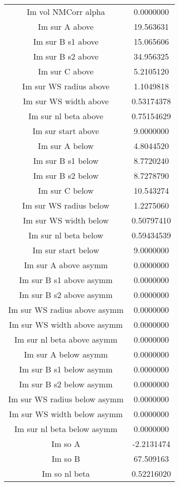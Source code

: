 \begin{tabular}{|c||c|}
Im vol NMCorr alpha & 0.0000000\\
Im sur A above & 19.563631\\
Im sur B s1 above & 15.065606\\
Im sur B s2 above & 34.956325\\
Im sur C above & 5.2105120\\
Im sur WS radius above & 1.1049818\\
Im sur WS width above & 0.53174378\\
Im sur nl beta above & 0.75154629\\
Im sur start above & 9.0000000\\
Im sur A below & 4.8044520\\
Im sur B s1 below & 8.7720240\\
Im sur B s2 below & 8.7278790\\
Im sur C below & 10.543274\\
Im sur WS radius below & 1.2275060\\
Im sur WS width below & 0.50797410\\
Im sur nl beta below & 0.59434539\\
Im sur start below & 9.0000000\\
Im sur A above asymm & 0.0000000\\
Im sur B s1 above asymm & 0.0000000\\
Im sur B s2 above asymm & 0.0000000\\
Im sur WS radius above asymm & 0.0000000\\
Im sur WS width above asymm & 0.0000000\\
Im sur nl beta above asymm & 0.0000000\\
Im sur A below asymm & 0.0000000\\
Im sur B s1 below asymm & 0.0000000\\
Im sur B s2 below asymm & 0.0000000\\
Im sur WS radius below asymm & 0.0000000\\
Im sur WS width below asymm & 0.0000000\\
Im sur nl beta below asymm & 0.0000000\\
Im so A & -2.2131474\\
Im so B & 67.509163\\
Im so nl beta & 0.52216020\\
\end{tabular}